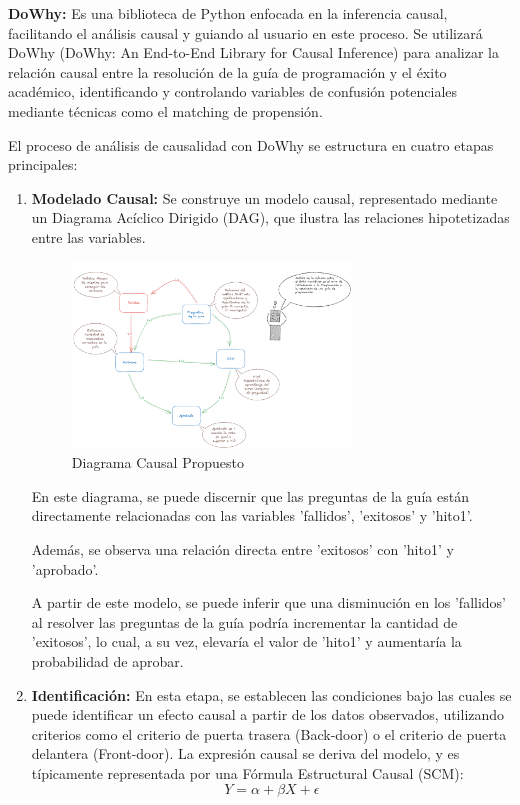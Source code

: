 \textbf{DoWhy:} Es una biblioteca de Python enfocada en la inferencia causal, facilitando el análisis causal y guiando al usuario en este proceso. Se utilizará DoWhy (DoWhy: An End-to-End Library for Causal Inference) \cite{sharma2020dowhy} para analizar la relación causal entre la resolución de la guía de programación y el éxito académico, identificando y controlando variables de confusión potenciales mediante técnicas como el matching de propensión.

El proceso de análisis de causalidad con DoWhy se estructura en cuatro etapas principales:

\begin{enumerate}
    \item \textbf{Modelado Causal:} Se construye un modelo causal, representado mediante un Diagrama Acíclico Dirigido (DAG), que ilustra las relaciones hipotetizadas entre las variables. 

    \begin{figure}[H]
      \centering
      \includegraphics[width=0.7\textwidth]{img/causalidad/diagrama_causal_tesis.png}
      \caption{Diagrama Causal Propuesto}
      \label{fig:diagrama_causal_propuesto}
    \end{figure}

    En este diagrama, se puede discernir que las preguntas de la guía están directamente relacionadas con las variables 'fallidos', 'exitosos' y 'hito1'.

    Además, se observa una relación directa entre 'exitosos' con 'hito1' y 'aprobado'.

    A partir de este modelo, se puede inferir que una disminución en los 'fallidos' al resolver las preguntas de la guía podría incrementar la cantidad de 'exitosos', lo cual, a su vez, elevaría el valor de 'hito1' y aumentaría la probabilidad de aprobar.

    \item \textbf{Identificación:} En esta etapa, se establecen las condiciones bajo las cuales se puede identificar un efecto causal a partir de los datos observados, utilizando criterios como el criterio de puerta trasera (Back-door) o el criterio de puerta delantera (Front-door). La expresión causal se deriva del modelo, y es típicamente representada por una Fórmula Estructural Causal (SCM):
    \begin{equation}
        Y = \alpha + \beta X + \epsilon
    \end{equation}


\end{enumerate}
